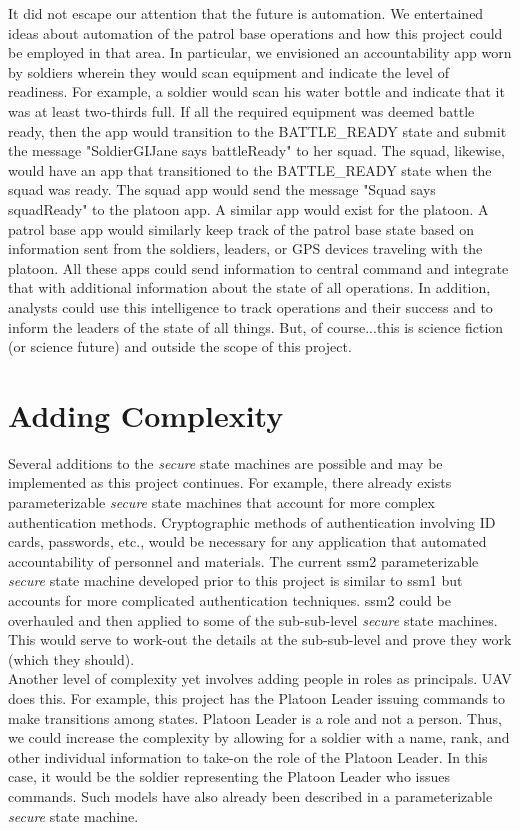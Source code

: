 It did not escape our attention that the future is automation.  We entertained ideas about automation of the
patrol base operations and how this project could be employed in that area.  In particular, we envisioned an
accountability app worn by soldiers wherein they would scan equipment and indicate the level of readiness.
For example, a soldier would scan his water bottle and indicate that it was at least two-thirds full.  If all
the required equipment was deemed battle ready, then the app would transition to the BATTLE_READY state and
submit the message "SoldierGIJane says battleReady" to her squad.  The squad, likewise, would have an app that
transitioned to the BATTLE_READY state when the squad was ready.  The squad app would send the message "Squad
says squadReady" to the platoon app.  A similar app would exist for the platoon.    A patrol base app would
similarly keep track of the patrol base state based on information sent from the soldiers, leaders, or GPS
devices traveling with the platoon.  All these apps could send information to central command and integrate
that with additional information about the state of all operations.  In addition, analysts could use this
intelligence to track operations and their success and to inform the leaders of the state of all things.
But, of course...this is science fiction (or science future) and outside the scope of this project.

\section*{Adding Complexity}
\label{sec:adding-complexity}

Several additions to the \emph{secure} state machines are possible and may be implemented as this project continues.
For example, there already exists parameterizable \emph{secure} state machines that account for more complex authentication
methods.  Cryptographic methods of authentication involving ID cards, passwords, etc., would be necessary for any
application that automated accountability of personnel and materials.  The current ssm2 parameterizable \emph{secure}
state machine developed prior to this project is similar to ssm1 but accounts for more complicated authentication
techniques.  ssm2 could be overhauled and then applied to some of the sub-sub-level \emph{secure} state machines.
This would serve to work-out the details at the sub-sub-level and prove they work (which they should).\\

Another level of complexity yet involves adding people in roles as principals.  UAV does this.  For example,
this project has the Platoon Leader issuing commands to make transitions among states.  Platoon Leader is a
role and not a person.  Thus, we could increase the complexity by allowing for a soldier with a name, rank,
and other individual information to take-on the role of the Platoon Leader.  In this case, it would be the
soldier representing the Platoon Leader who issues commands.  Such models have also already been described
in a parameterizable \emph{secure} state machine.\\

